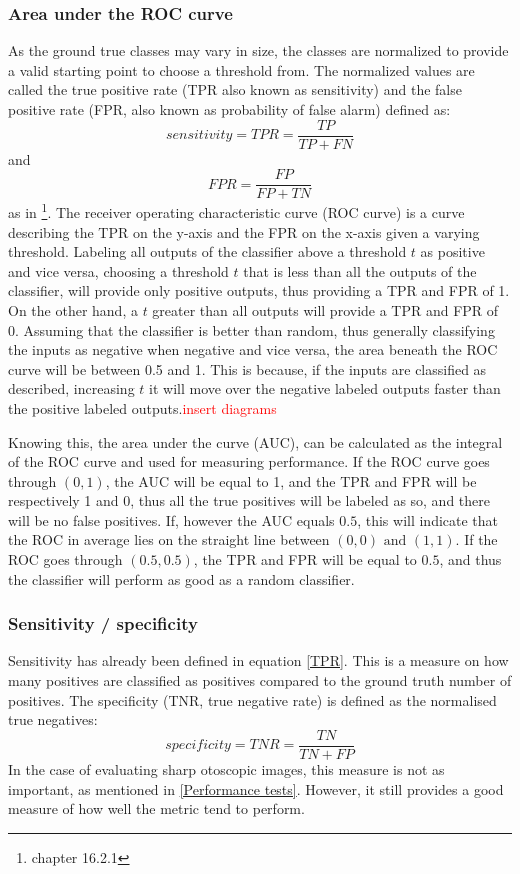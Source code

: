 \subsubsection{Area under the ROC curve}
As the ground true classes may vary in size, the classes are normalized to provide a valid starting point to choose a threshold from. The normalized values are called the true positive rate (TPR also known as sensitivity) and the false positive rate (FPR, also known as probability of false alarm) defined as:
\begin{equation}
    sensitivity = TPR = \dfrac{TP}{TP+FN}
\end{equation}\label{TPR}
and
\begin{equation}
    FPR = \dfrac{FP}{FP+TN}
\end{equation}\label{FPR}
as in \cite{ML_book}\footnote{chapter 16.2.1}.
The receiver operating characteristic curve (ROC curve) is a curve describing the TPR on the y-axis and the FPR on the x-axis given a varying threshold. Labeling all outputs of the classifier above a threshold $t$ as positive and vice versa, choosing a threshold $t$ that is less than all the outputs of the classifier, will provide only positive outputs, thus providing a TPR and FPR of 1. On the other hand, a $t$ greater than all outputs will provide a TPR and FPR of 0. Assuming that the classifier is better than random, thus generally classifying the inputs as negative when negative and vice versa, the area beneath the ROC curve will be between 0.5 and 1. This is because, if the inputs are classified as described, increasing $t$ it will move over the negative labeled outputs faster than the positive labeled outputs.\textcolor{red}{insert diagrams}

Knowing this, the area under the curve (AUC), can be calculated as the integral of the ROC curve and used for measuring performance. If the ROC curve goes through $(0,1)$, the AUC will be equal to 1, and the TPR and FPR will be respectively 1 and 0, thus all the true positives will be labeled as so, and there will be no false positives. If, however the AUC equals $0.5$, this will indicate that the ROC in average lies on the straight line between $(0,0) \text{ and } (1,1)$. If the ROC goes through $(0.5,0.5)$, the TPR and FPR will be equal to $0.5$, and thus the classifier will perform as good as a random classifier.


\subsubsection{Sensitivity / specificity}
Sensitivity has already been defined in equation \ref{TPR}. This is a measure on how many positives are classified as positives compared to the ground truth number of positives. The specificity (TNR, true negative rate) is defined as the normalised true negatives:
\begin{equation}
    specificity = TNR = \dfrac{TN}{TN+FP}
\end{equation}
In the case of evaluating sharp otoscopic images, this measure is not as important, as mentioned in \ref{Performance tests}. However, it still provides a good measure of how well the metric tend to perform.


